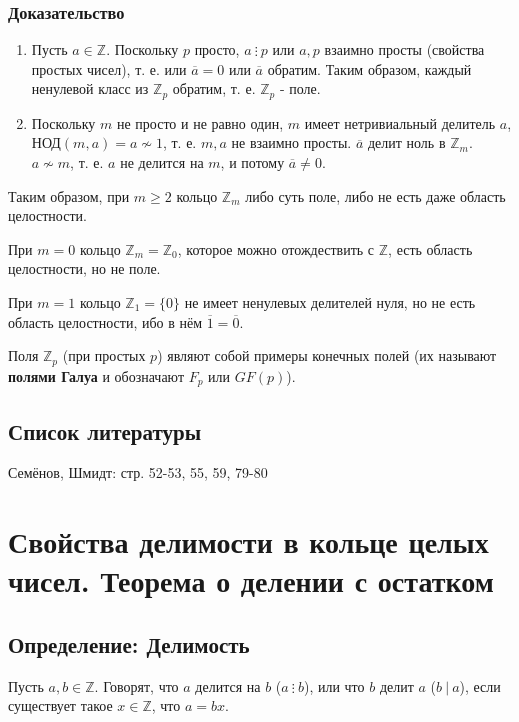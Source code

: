 \documentclass{article}
\newcommand{\divs}{~\vdots~}
\begin{document}
\subsubsection*{Доказательство}
\begin{enumerate}
\item Пусть $a \in \mathbb Z$. Поскольку $p$ просто, $a \divs p$ или $a, p$ взаимно просты (свойства простых чисел), т. е. или $\overline a = 0$ или $\overline a$ обратим. Таким образом, каждый ненулевой класс из $\mathbb Z_p$ обратим, т. е. $\mathbb Z_p$ - поле.
\item Поскольку $m$ не просто и не равно один, $m$ имеет нетривиальный делитель $a$, $\textsf{НОД}(m, a) = a \not \sim 1$, т. е. $m, a$ не взаимно просты. $\overline a$ делит ноль в $\mathbb Z_m$. $a \not \sim m$, т. е. $a$ не делится на $m$, и потому $\overline a \neq 0$.
\end{enumerate}

Таким образом, при $m \geq 2$ кольцо $\mathbb Z_m$ либо суть поле, либо не есть даже область целостности.

При $m = 0$ кольцо $\mathbb Z_m = \mathbb Z_0$, которое можно отождествить с $\mathbb Z$, есть область целостности, но не поле.

При $m = 1$ кольцо $\mathbb Z_1 = \{0\}$ не имеет ненулевых делителей нуля, но не есть область целостности, ибо в нём $\overline 1 = \overline 0$.

Поля $\mathbb Z_p$ (при простых $p$) являют собой примеры конечных полей (их называют \textbf{полями Галуа} и обозначают $F_p$ или $GF(p)$).

\subsection*{Список литературы}

Семёнов, Шмидт: стр. 52-53, 55, 59, 79-80

\newpage
\section{Свойства делимости в кольце целых чисел. Теорема о делении с остатком}
\subsection{Определение: Делимость}
Пусть $a, b \in \mathbb Z$. Говорят, что $a$ делится на $b$ ($a \divs b$), или что $b$ делит $a$ ($b~\vert~a$), если существует такое $x \in \mathbb Z$, что $a = bx$.
\end{document}
